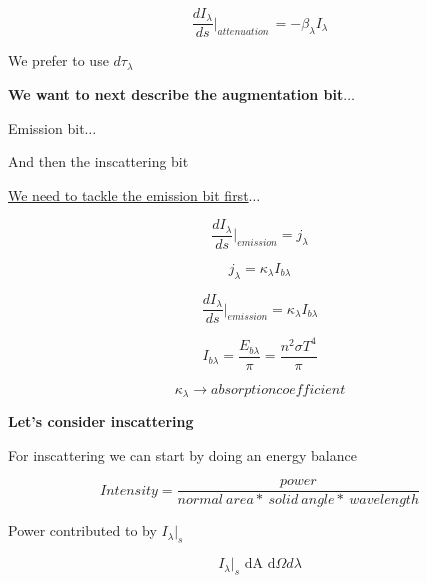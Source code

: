\documentclass[12pt]{article}
\renewcommand{\_}{\kern-1.5pt\textunderscore\kern-1.5pt}
\begin{document}
 \[ \frac{dI_{ \lambda }}{ds}\vert _{attenuation~}=- \beta _{ \lambda }I_{ \lambda } \] \par

We prefer to use  \( d \tau_{ \lambda } \) \par

\textbf{We want to next describe the augmentation bit$ \ldots $ }\par

Emission bit$ \ldots $ \par

And then the inscattering bit\par

\uline{We need to tackle the emission bit first$ \ldots $ }\par


\vspace{\baselineskip}
 \[ \frac{dI_{ \lambda }}{ds}\vert _{emission}=j_{ \lambda } \] \par

 \[ j_{ \lambda }= \kappa _{ \lambda }I_{b \lambda } \] \par

 \[ \frac{dI_{ \lambda }}{ds}\vert _{emission}= \kappa _{ \lambda }I_{b \lambda } \] \par

 \[ I_{b \lambda }=\frac{E_{b \lambda }}{ \pi }=\frac{n^{2} \sigma T^{4}}{ \pi } \] \par

 \[  \kappa _{ \lambda } \rightarrow absorption coefficient \] \par

\par

\textbf{Let’s consider inscattering}\par

\par

For inscattering we can start by doing an energy balance\par


\vspace{\baselineskip}
 \[ Intensity=\frac{power}{normal~area\ast~solid~angle\ast~wavelength} \] \par

Power contributed to by  \( I_{ \lambda }\vert _{s} \) \par

 \[ I_{ \lambda }\vert _{s}\text{ dA d} \Omega  d \lambda  \] \par
\end{document}
